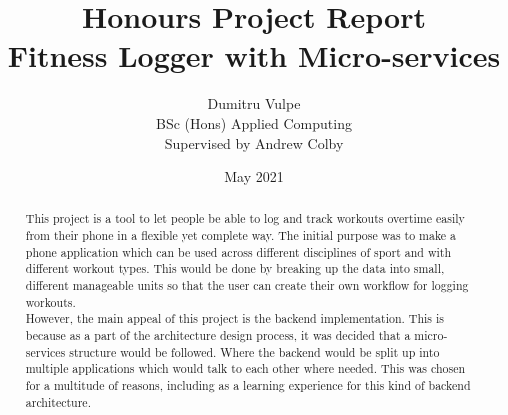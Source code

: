 \documentclass{article}
\title{Honours Project Report\\Fitness Logger with Micro-services}
\author{Dumitru Vulpe\\BSc (Hons) Applied Computing\\Supervised by Andrew Colby}
\date{May 2021}
\begin{document}
\maketitle

\vspace*{\fill/2}
\begin{abstract} 

This project is a tool to let people be able to log and track workouts overtime easily from their phone in a flexible yet complete way. The initial purpose was to make a phone application which can be used across different disciplines of sport and with different workout types. This would be done by breaking up the data into small, different manageable units so that the user can create their own workflow for logging workouts.\\
However, the main appeal of this project is the backend implementation. This is because as a part of the architecture design process, it was decided that a micro-services structure would be followed. Where the backend would be split up into multiple applications which would talk to each other where needed. This was chosen for a multitude of reasons, including as a learning experience for this kind of backend architecture.\\

\end{abstract}
\vspace*{\fill}

\newpage
\tableofcontents 
\listoffigures
\newpage
\end{document}
